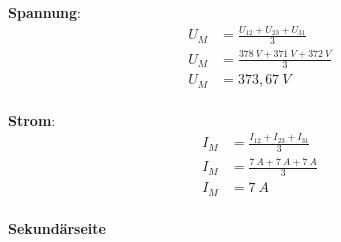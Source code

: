 \begin{enumerate}[label=\alph*)]
\begin{tcolorbox}[colback=gray!30,
			      colframe=black,
			      width=0.9\textwidth,
		      ]
{			      \begin{minipage}{0.5\textwidth}
				      \textbf{Spannung}:
				      \begin{align*}
					      U_M & = \frac{U_{12} + U_{23} + U_{31}}{3} \\
					      U_M & = \frac{378\ V + 371\ V + 372\ V}{3} \\
					      U_M & = 373,67\ V                          \\
				      \end{align*}
			      \end{minipage}\hfill
			      \begin{minipage}{0.5\textwidth}
				      \textbf{Strom}:
				      \begin{align*}
					      I_M & = \frac{I_{12} + I_{23} + I_{31}}{3} \\
					      I_M & = \frac{7\ A + 7\ A + 7\ A}{3}       \\
					      I_M & = 7\ A                               \\
				      \end{align*}
			      \end{minipage}
		      }
	      \end{tcolorbox}

	      \textbf{Sekundärseite}\\ \ \\

	      \begin{tcolorbox}[colback=gray!30,
			      colframe=black,
			      width=0.9\textwidth,
		      ]
		      \parbox{\textwidth}{

}
\end{tcolorbox}
\end{enumerate}
